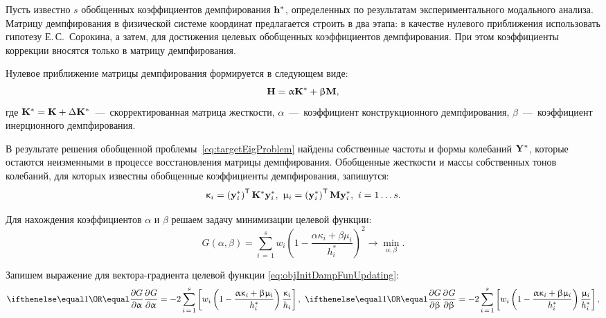Пусть известно $ s $ обобщенных коэффициентов демпфирования $ \mathbf{h} ^ \ast $, определенных по результатам экспериментального модального анализа. Матрицу демпфирования в физической системе координат предлагается строить в два этапа: в качестве нулевого приближения использовать гипотезу Е.\,С.~Сорокина, а затем, для достижения целевых обобщенных коэффициентов демпфирования. При этом коэффициенты коррекции вносятся только в матрицу демпфирования.

Нулевое приближение матрицы демпфирования формируется в следующем виде:
\begin{equation}
	\mathbf{H} = \upalpha \mathbf{K} ^ \ast + \upbeta \mathbf{M},
\end{equation}
где $ \mathbf{K} ^ \ast = \mathbf{K} + \Delta \mathbf{K} ^ \ast $~---~скорректированная матрица жесткости, $ \alpha $~---~коэффициент конструкционного демпфирования, $ \beta $~---~коэффициент инерционного демпфирования.

В результате решения обобщенной проблемы~\eqref{eq:targetEigProblem} найдены собственные частоты и формы колебаний $ \mathbf{Y} ^ \ast $, которые остаются неизменными в процессе восстановления матрицы демпфирования. Обобщенные жесткости и массы собственных тонов колебаний, для которых известны обобщенные коэффициенты демпфирования, запишутся:
\begin{equation}
	\upkappa_i = \left( \mathbf{y}_i ^ \ast \right) ^ \mathsf{T} \mathbf{K} ^ \ast \mathbf{y}_i ^ \ast, \
	\upmu_i = \left( \mathbf{y}_i ^ \ast \right) ^ \mathsf{T} \mathbf{M} \mathbf{y}_i ^ \ast, \ i = 1 \hdots s. 
\end{equation}

Для нахождения коэффициентов $ \alpha $ и $ \beta $ решаем задачу минимизации целевой функции:
\begin{equation}
	G(\alpha, \beta) = \sum \limits_{i\,=\,1} ^ s w_i \left( 1 - \frac{\alpha \kappa_i + \beta \mu_i}{h_i ^ \ast} \right)^2 \rightarrow \min_{\alpha, \beta}.
	\label{eq:objInitDampFunUpdating}
\end{equation}

Запишем выражение для вектора-градиента целевой функции \eqref{eq:objInitDampFunUpdating}:
\begin{equation*}
	\partDer{G}{\alpha}{} = -2 \sum_{i\,=\,1} ^ s \sbrackets{w_i \rbrackets{1 - \frac{\alpha \kappa_i + \beta \mu_i}{h_i ^ \ast}} \frac{\kappa_i}{h_i}}, \
	 \partDer{G}{\beta}{} = -2 \sum_{i\,=\,1} ^ s \sbrackets{w_i \rbrackets{1 - \frac{\alpha \kappa_i + \beta \mu_i}{h_i ^ \ast}} \frac{\mu_i}{h_i ^ \ast}},
\end{equation*}

